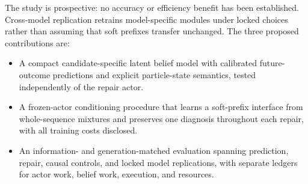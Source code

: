 The study is prospective: no accuracy or efficiency benefit has been established. Cross-model replication retrains model-specific modules under locked choices rather than assuming that soft prefixes transfer unchanged. The three proposed contributions are:
\begin{itemize}
\item A compact candidate-specific latent belief model with calibrated future-outcome predictions and explicit particle-state semantics, tested independently of the repair actor.
\item A frozen-actor conditioning procedure that learns a soft-prefix interface from whole-sequence mixtures and preserves one diagnosis throughout each repair, with all training costs disclosed.
\item An information- and generation-matched evaluation spanning prediction, repair, causal controls, and locked model replications, with separate ledgers for actor work, belief work, execution, and resources.
\end{itemize}
